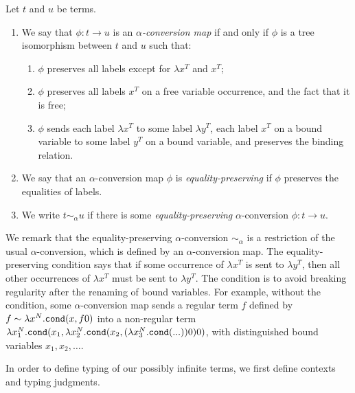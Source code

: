 \begin{definition}
\label{definition-alpha-conversion}
Let $t$ and $u$ be terms.
\begin{enumerate}
\item
We say that $\phi:t \rightarrow u$ is an \emph{$\alpha$-conversion map} if and only if 
$\phi$ is a tree isomorphism between $t$ and $u$ such that:
\begin{enumerate}
\item
$\phi$ preserves all labels except for $\lambda x^T$ and $x^T$;
\item 
$\phi$ preserves all labels $x^T$
on a free variable occurrence, and the fact that it is free;
\item
$\phi$ sends each label $\lambda x^T$ to some label $\lambda y^T$, each label $x^T$
on a bound variable to some label $y^T$ on a bound variable, and preserves the
binding relation. 
\end{enumerate}

\item
  We say that an $\alpha$-conversion map $\phi$ is \emph{equality-preserving} if $\phi$ preserves
  the equalities of labels. 
\item
We write $t \sim_\alpha u$ if there is some \emph{equality-preserving} 
$\alpha$-conversion $\phi:t \rightarrow u$.
\end{enumerate}
\end{definition}

We remark that the equality-preserving $\alpha$-conversion $\sim_\alpha$ is
a restriction of the usual $\alpha$-conversion, which is defined by an $\alpha$-conversion map.
The equality-preserving condition says that if some occurrence of $\lambda x^T$ is sent to $\lambda y^T$, then
all other occurrences of $\lambda x^T$ must be sent to $\lambda y^T$. 
The condition is to avoid breaking regularity after the renaming of bound variables.
For example, without the condition, some $\alpha$-conversion map sends
a regular term $f$ defined by $f\sim \lambda x^{N}.{\tt cond}(x,f0)$ into
a non-regular term $\lambda x_1^{N}.{\tt cond}(x_1,\lambda x_2^{N}.{\tt cond}(x_2,(\lambda x_3^{N}.{\tt cond}(...))0)0)$,
with distinguished bound variables $x_1,x_2,\ldots$. 

In order to define typing of our possibly infinite terms, we first 
define contexts and typing judgments.


